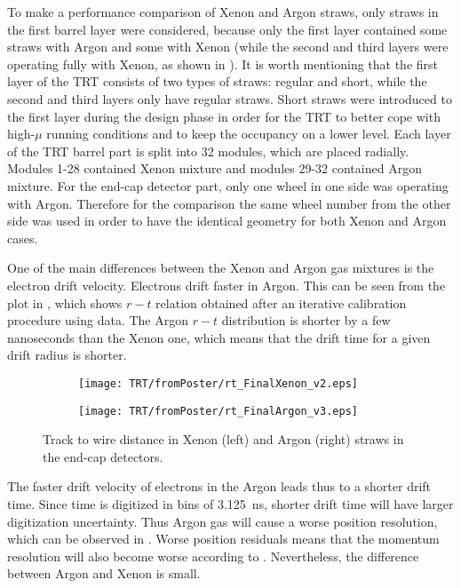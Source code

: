 To make a performance comparison of Xenon and Argon straws, 
only straws in the first barrel layer were considered, because only the first layer contained some straws with Argon and some with Xenon 
(while the second and third layers were operating fully with Xenon, as shown in ).
It is worth mentioning that the first layer of the TRT consists of two types of straws: regular and short, while the second and third layers only have regular straws.
Short straws were introduced to the first layer during the design phase in order for the TRT to
better cope with high-$\mu$ running conditions and to keep the occupancy on a lower level.
Each layer of the TRT barrel part is split into 32 modules, which are placed radially. 
Modules 1-28 contained Xenon mixture and modules 29-32 contained Argon mixture.
For the end-cap detector part, only one wheel in one side was operating with Argon. Therefore for the comparison the same wheel number from the other side was used in order
to have the identical geometry for both Xenon and Argon cases.

One of the main differences between the Xenon and Argon gas mixtures is the electron drift velocity. Electrons drift faster in Argon. 
This can be seen from the plot in , 
which shows $r-t$ relation obtained after an iterative calibration procedure using data.
The Argon $r-t$ distribution is shorter by a few nanoseconds than the Xenon one, which means that the drift time for a given drift radius is shorter.

\begin{figure}[h]
\begin{subfigure}{.5\textwidth}
  \centering
  \texttt{[image: TRT/fromPoster/rt\_FinalXenon\_v2.eps]}
\end{subfigure}%
\begin{subfigure}{.5\textwidth}
  \centering
  \texttt{[image: TRT/fromPoster/rt\_FinalArgon\_v3.eps]}
\end{subfigure}

\caption{Track to wire distance in Xenon (left) and Argon (right) straws in the end-cap detectors.}
  \label{fig:RT_xenon_argon}
\end{figure}

The faster drift velocity of electrons in the Argon leads thus to a shorter drift time. Since time is digitized in bins of 3.125~ns, shorter drift time will have larger digitization uncertainty. Thus Argon gas will cause a worse position resolution, which can be observed in . Worse position residuals means that the momentum resolution will also become worse according to
. Nevertheless, the difference between Argon and Xenon is small.


